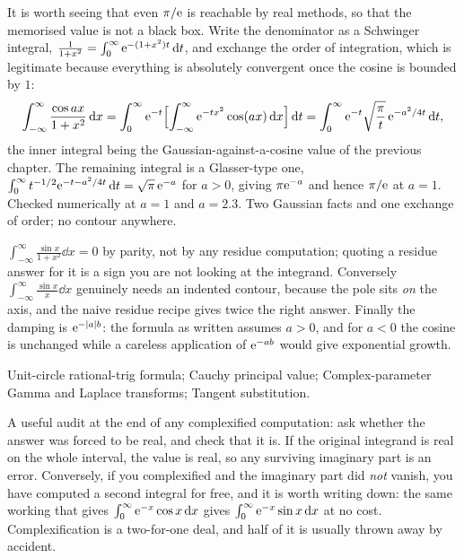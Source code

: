 \begin{worked}
It is worth seeing that even $\pi/\mathrm{e}$ is reachable by real methods, so that the memorised value is not a black box. Write the denominator as a Schwinger integral, $\frac{1}{1+x^{2}}=\int_0^{\infty}\mathrm{e}^{-(1+x^{2})t}\,\mathrm{d} t$, and exchange the order of integration, which is legitimate because everything is absolutely convergent once the cosine is bounded by $1$:
\[\int_{-\infty}^{\infty}\frac{\cos ax}{1+x^{2}}\,\mathrm{d} x=\int_0^{\infty}\mathrm{e}^{-t}\Bigl[\int_{-\infty}^{\infty}\mathrm{e}^{-tx^{2}}\cos(ax)\,\mathrm{d} x\Bigr]\,\mathrm{d} t
=\int_0^{\infty}\mathrm{e}^{-t}\sqrt{\frac{\pi}{t}}\,\mathrm{e}^{-a^{2}/4t}\,\mathrm{d} t,\]
the inner integral being the Gaussian-against-a-cosine value of the previous chapter. The remaining integral is a Glasser-type one, $\int_0^{\infty}t^{-1/2}\mathrm{e}^{-t-a^{2}/4t}\,\mathrm{d} t=\sqrt\pi\,\mathrm{e}^{-a}$ for $a>0$, giving $\pi\mathrm{e}^{-a}$ and hence $\pi/\mathrm{e}$ at $a=1$. Checked numerically at $a=1$ and $a=2.3$. Two Gaussian facts and one exchange of order; no contour anywhere.
\end{worked}

\begin{trap}
$\int_{-\infty}^{\infty}\frac{\sin x}{1+x^{2}}\dd x=0$ by parity, not by any residue computation; quoting a residue answer for it is a sign you are not looking at the integrand. Conversely $\int_{-\infty}^{\infty}\frac{\sin x}{x}\dd x$ genuinely needs an indented contour, because the pole sits \emph{on} the axis, and the naive residue recipe gives twice the right answer. Finally the damping is $\mathrm{e}^{-\left\lvert a\right\rvert b}$: the formula as written assumes $a>0$, and for $a<0$ the cosine is unchanged while a careless application of $\mathrm{e}^{-ab}$ would give exponential growth.
\end{trap}

\begin{seealsob}Unit-circle rational-trig formula; Cauchy principal value; Complex-parameter Gamma and Laplace transforms; Tangent substitution.\end{seealsob}

\begin{keynote}
A useful audit at the end of any complexified computation: ask whether the answer was forced to be real, and check that it is. If the original integrand is real on the whole interval, the value is real, so any surviving imaginary part is an error. Conversely, if you complexified and the imaginary part did \emph{not} vanish, you have computed a second integral for free, and it is worth writing down: the same working that gives $\int_0^{\infty}\mathrm{e}^{-x}\cos x\,\mathrm{d} x$ gives $\int_0^{\infty}\mathrm{e}^{-x}\sin x\,\mathrm{d} x$ at no cost. Complexification is a two-for-one deal, and half of it is usually thrown away by accident.
\end{keynote}

